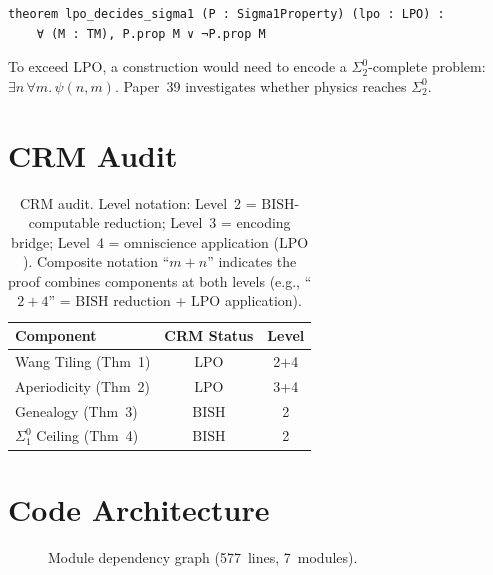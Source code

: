 \documentclass[11pt,a4paper]{article}
\theoremstyle{plain}
\theoremstyle{definition}
\newcommand{\LPO}{\ensuremath{\mathrm{LPO}}}
\newcommand{\BISH}{\ensuremath{\mathrm{BISH}}}
\begin{document}
\begin{lstlisting}[caption={$\Sigma_1^0$ ceiling: \texttt{Ceiling.lean}}]
theorem lpo_decides_sigma1 (P : Sigma1Property) (lpo : LPO) :
    ∀ (M : TM), P.prop M ∨ ¬P.prop M
\end{lstlisting}

To exceed \LPO, a construction would need to encode a
$\Sigma_2^0$-complete problem:
$\exists n\,\forall m.\,\psi(n,m)$.
Paper~39 investigates whether physics reaches $\Sigma_2^0$.

\section{CRM Audit}\label{sec:audit}

\begin{table}[ht]
\centering
\begin{tabular}{@{}lcc@{}}
\toprule
\textbf{Component} & \textbf{CRM Status} & \textbf{Level} \\
\midrule
Wang Tiling (Thm~1) & \LPO & 2+4 \\
Aperiodicity (Thm~2) & \LPO & 3+4 \\
Genealogy (Thm~3) & $\BISH$ & 2 \\
$\Sigma_1^0$ Ceiling (Thm~4) & $\BISH$ & 2 \\
\bottomrule
\end{tabular}
\caption{CRM audit.  Level notation: Level~2 = $\BISH$-computable
  reduction; Level~3 = encoding bridge; Level~4 = omniscience
  application (\LPO).  Composite notation ``$m{+}n$'' indicates
  the proof combines components at both levels (e.g., ``$2{+}4$''
  = $\BISH$ reduction + \LPO{} application).}
\label{tab:audit}
\end{table}

\section{Code Architecture}\label{sec:arch}

\begin{figure}[ht]
\centering
{}
\caption{Module dependency graph (577~lines, 7~modules).}
\label{fig:arch}
\end{figure}
\end{document}
